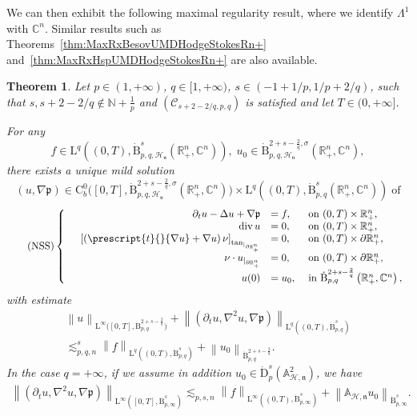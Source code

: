 \documentclass[10pt]{amsart}
\newtheorem{theo}{Theorem}[section]
\theoremstyle{definition}\newtheorem{defi}[theo]{Definition}\newtheorem{rema}[theo]{Remark}\newtheorem{exam}[theo]{Example}\newtheorem{exem}[theo]{Example}\newtheorem{nota}[theo]{Notation}
\renewcommand*{\div}{\mathrm{div\,}}
\newcommand{\bbA}{\mathbb{A}}
\newcommand{\bbR}{\mathbb{R}}
\newcommand{\bbC}{\mathbb{C}}
\newcommand{\bbN}{\mathbb{N}}
\newcommand{\rmB}{\mathrm{B}}
\newcommand{\rmD}{\mathrm{D}}
\newcommand{\rmL}{\mathrm{L}}
\newcommand{\rmC}{\mathrm{C}}
\newcommand{\rtan}{\mathrm{tan}}
\newcommand{\clH}{\mathcal{H}}
\newcommand{\clC}{\mathcal{C}}
\newcommand{\fkn}{\mathfrak{n}}
\begin{document}
We can then exhibit the following maximal regularity result, where we identify $\Lambda^1$ with $\bbC^n$. Similar results such as Theorems~\ref{thm:MaxRxBesovUMDHodgeStokesRn+} and~\ref{thm:MaxRxHspUMDHodgeStokesRn+} are also available.

\begin{theo}\label{thm:MaxRxBesovNavierSlipStokesRn+}
Let $p\in(1,+\infty)$, $q\in[1,+\infty)$, $s\in(-1+1/p,1/p+2/q)$, such that $s,s+2-2/q\notin \bbN +\frac{1}{p}$ and $(\clC_{s+2-2/q,p,q})$ is satisfied and let $T\in(0,+\infty]$.

For any 
\[
f\in \rmL^q\left((0,T),\dot{\rmB}^{s}_{p,q,\mathcal{\clH_{\fkn}}}\left(\bbR^n_+,\bbC^n\right)\right),\; u_0\in \dot{\rmB}^{2+s-\frac{2}{q},\sigma}_{p,q,\clH_\fkn}\left(\bbR^n_+,\bbC^n\right),
\]
there exists a unique mild solution 
\[
\left(u,\nabla \mathfrak{p}\right) \in \rmC ^0_b\big([0,T],\dot{\rmB}^{2+s-\frac{2}{q},\sigma}_{p,q,\clH_\fkn}\left(\bbR^n_+,\bbC^n\right)\big)\times \rmL^q\left((0,T),\dot{\rmB}^{s}_{p,q}\left(\bbR^n_+,\bbC^n\right)\right) \;\text{of}
\]
\begin{equation}\label{eq:StokesNavierSlipBCSystem}
\tag{NSS}
\left\{
\begin{array}{rrll}
&{\partial_t u - \Delta u+\nabla \mathfrak{p}}  &{= f,} &{\text{ on } (0,T)\times\bbR^n_+,}\\
&{\div u} &{=  0,} &{\text{ on } (0,T)\times\bbR^n_+,}\\
&{\left[ \left(\prescript{t}{}{{\nabla u}} + \nabla u\right)\nu \right]_{{\rtan}_{|_{\partial\bbR^n_+}}}} &{= 0,}
&{\text{ on } (0,T)\times\partial\bbR^n_+,}\\
&{\nu \cdot u_{|_{\partial\bbR^n_+}}} &{=  0,}
&{\text{ on } (0,T)\times\partial\bbR^n_+,}\\
&{u(0)} &{=  u_0,} &{\text{ in } \dot{\rmB}^{2+s-\frac{2}{q}}_{p,q}\left(\bbR^n_+,\bbC^n\right),}
\end{array}\right.
\end{equation}
with estimate
\begin{multline*}
\left\| u \right\|_{\rmL^\infty\big([0,T],\dot{\rmB}^{2+s-\frac{2}{q}}_{p,q}\big)} + 
\left\| \left(\partial_t u, \nabla^2 u,\nabla \mathfrak{p}\right) \right\|_{\rmL^q\left((0,T),\dot{\rmB}^{s}_{p,q}\right)}\\
\lesssim_{p,q,n}^{s} \left\| f \right\|_{\rmL^q\left((0,T),\dot{\rmB}^{s}_{p,q}\right)} + \left\| u_0 \right\|_{\dot{\rmB}^{2+s-\frac{2}{q}}_{p,q}}.
\end{multline*}
In the case $q=+\infty$, if we assume in addition $u_0\in \dot{\rmD}^{s}_{p}(\bbA_{\clH,\fkn}^2)$, we have
\begin{align*}
\left\| \left(\partial_t u, \nabla^2 u,\nabla \mathfrak{p}\right) \right\|_{\rmL^\infty\left([0,T],\dot{\rmB}^{s}_{p,\infty}\right)} \lesssim_{p,s,n} \left\| f \right\|_{\rmL^\infty\left((0,T),\dot{\rmB}^{s}_{p,\infty}\right)} + \left\| \bbA_{\clH,\fkn} u_0 \right\|_{\dot{\rmB}^{s}_{p,\infty}}.
\end{align*}
\end{theo}
\end{document}
